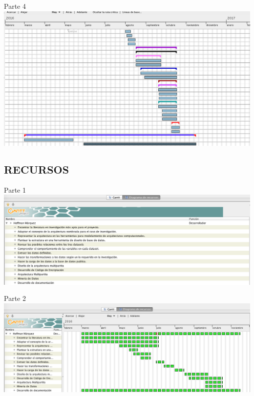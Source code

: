 \documentclass[a4paper, 12pt, oneside]{article}
\theoremstyle{definition}
\theoremstyle{remark}
\begin{document}
\begin{table}
\begin{center}
Parte 4
\includegraphics[width=\textwidth]{Imagen4.png}
\end{center}
\end{table}
\clearpage

\begin{table}
\begin{center}
\section{RECURSOS}
\end{center}
\begin{center}
Parte 1
\includegraphics[width=\textwidth]{Hoffman1.png}
\end{center}
\end{table}
\clearpage

\begin{table}
\begin{center}
Parte 2
\includegraphics[width=\textwidth]{Hoffma2.png}
\end{center}
\end{table}
\clearpage
\end{document}
